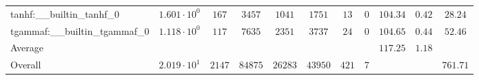 \begin{tabular}{|l|c|c|c|c|c|c|c|c|c|c|}
tanhf:\_\_builtin\_tanhf\_0               & $ 1.601 \cdot 10^{0}  $ & $ 167    $ & $ 3457  $ & $ 1041  $ & $ 1751  $ & $ 13  $ & $ 0 $ & $ 104.34      $ & $ 0.42    $ & $ 28.24   $ \\
tgammaf:\_\_builtin\_tgammaf\_0           & $ 1.118 \cdot 10^{0}  $ & $ 117    $ & $ 7635  $ & $ 2351  $ & $ 3737  $ & $ 24  $ & $ 0 $ & $ 104.65      $ & $ 0.44    $ & $ 52.46   $ \\
\hline
Average                                   & $                     $ & $        $ & $       $ & $       $ & $       $ & $     $ & $   $ & $ 117.25      $ & $ 1.18    $ & $         $ \\
\hline
Overall                                   & $ 2.019 \cdot 10^{1}  $ & $ 2147   $ & $ 84875 $ & $ 26283 $ & $ 43950 $ & $ 421 $ & $ 7 $ & $             $ & $         $ & $ 761.71  $ \\
\hline
\end{tabular}
